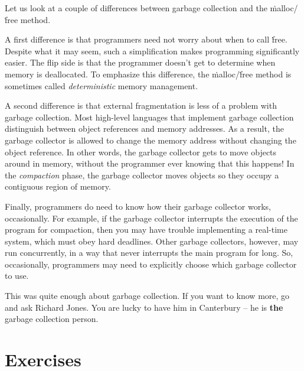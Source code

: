 Let us look at a couple of differences
  between garbage collection and the \.{malloc}\slash\.{free} method.

A first difference is that programmers need not worry about when to call \.{free}.
Despite what it may seem,
  such a simplification makes programming significantly easier.
The flip side is that
  the programmer doesn't get to determine when memory is deallocated.
To emphasize this difference,
  the \.{malloc}\slash\.{free} method
  is sometimes called \emph{deterministic} memory management.


A second difference is that external fragmentation is less of a problem
  with garbage collection.
Most high-level languages that implement garbage collection
  distinguish between object references and memory addresses.
As a result,
  the garbage collector is allowed to change the memory address
  without changing the object reference.
In other words, the garbage collector gets to move objects around in memory,
  without the programmer ever knowing that this happens!
In the \emph{compaction} phase,
  the garbage collector moves objects so they occupy a contiguous region of memory.

Finally, programmers do need to know how their garbage collector works,
  occasionally.
For example,
  if the garbage collector interrupts the execution of the program for compaction,
  then you may have trouble implementing a real-time system,
  which must obey hard deadlines.
Other garbage collectors, however, may run concurrently,
  in a way that never interrupts the main program for long.
So, occasionally, programmers may need to explicitly choose
  which garbage collector to use.

This was quite enough about garbage collection.
If you want to know more, go and ask Richard Jones.
You are lucky to have him in Canterbury --
  he is {\bf the} garbage collection person.

\section*{Exercises}

